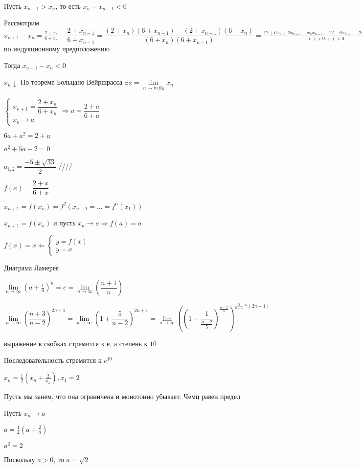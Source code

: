 \documentclass{book}
\begin{document}
Пусть $x_{n-1}>x_n$, то есть $x_n-x_{n-1}<0$

Рассмотрим $x_{n+1}-x_n = \frac{2+x_n}{6+x_n}-\dfrac{2+x_{n-1}}{6+x_{n-1}} = \dfrac{(2+x_n)(6+x_{n-1})-(2+x_{n-1})(6+x_n)}{(6+x_n)(6+x_{n-1})} = \frac{12+6x_n+2x_{n-1}+x_nx_{n-1}-12-6x_{n-1}-2x_n-x_{n-1}x_n}{()>0, ()>0}=\dfrac{4(x_n-x_{n-1})}{()()}<0$ по индукционному предположению

Тогда $x_{n+1}-x_n<0$

$x_n\downarrow$ По теореме Больцано-Вейршрасса $\exists a = \lim\limits_{n\to infty}x_n$

$
\begin{cases}
	x_{n+1}=\dfrac{2+x_n}{6+x_n}\\
	x_n\to a
\end{cases}
\Rightarrow a = \dfrac{2+a}{6+a}$

$6a+a^2=2+a$

$a^2+5a-2 = 0$

$a_{1, 2}=\dfrac{-5\pm \sqrt{33}}{2}$
////

$f(x)=\dfrac{2+x}{6+x}$

$x_{n+1}=f(x_n)=f^2(x_{n-1} = \hdots = f^n(x_1))$

$x_{n+1}=f(x_n)$ и  пусть $x_n\to a  \Rightarrow f(a)=a$

$f(x)=x\Longleftarrow
\begin{cases}
y=f(x)\\
y=x
\end{cases}
$

Диаграма Ламерея


$\lim\limits_{n\to \infty}(a+\frac{1}{n})^n=e=\lim\limits_{n\to \infty}(\dfrac{n+1}{n})$

$\lim\limits_{n\to \infty}(\dfrac{n+3}{n-2})^{2n+1}=\lim\limits_{n\to \infty}(1+\dfrac{5}{n-2})^{2n+1}=
\lim\limits_{n\to \infty}((1+\dfrac{1}{\frac{n-2}{5}})^{\frac{n-2}{5}})^{\frac{5}{n-2}*(2n+1)}$

выражение в скобках стремится к $е$, а степень к $10$

Последовательность стремится к $e^{10}$

$x_n = \frac{1}{2}(x_n+\frac{2}{x_n}), x_1=2$

Пусть мы занем, что она ограничена и монотонно убывает. Чемц равен предел

Пусть $x_n\to a$

$a = \frac{1}{2}(a+\frac{2}{a})$

$a^2 = 2$

Поскольку $a>0$, то $a = \sqrt{2}$
\end{document}
